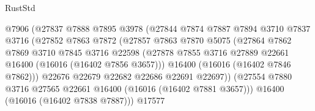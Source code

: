 \begin{lexlean}{RustStd}
\begin{coremodule}
                                    @7906
                                    (@27837
                                      @7888
                                      @7895
                                      @3978
                                      (@27844
                                        @7874
                                        @7887
                                        @7894
                                        @3710
                                        @7837
                                        @3716
                                        (@27852
                                          @7863
                                          @7872
                                          (@27857
                                            @7863
                                            @7870
                                            @5075
                                            (@27864
                                              @7862
                                              @7869
                                              @3710
                                              @7845
                                              @3716
                                              @22598
                                              (@27878
                                                @7855
                                                @3716
                                                @27889
                                                @22661
                                                @16400
                                                (@16016 (@16402 @7856 @3657)))
                                              @16400
                                              (@16016 (@16402 @7846 @7862)))
                                            @22676
                                            @22679
                                            @22682
                                            @22686
                                            @22691
                                            @22697))
                                        (@27554
                                          @7880
                                          @3716
                                          @27565
                                          @22661
                                          @16400
                                          (@16016 (@16402 @7881 @3657)))
                                        @16400
                                        (@16016 (@16402 @7838 @7887)))
                                      @17577

\end{coremodule}
\end{lexlean}

